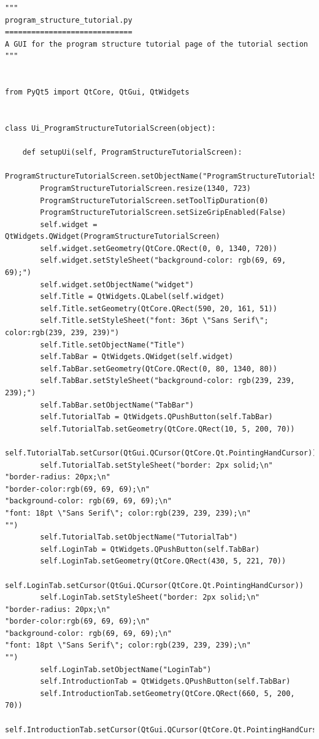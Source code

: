 \documentclass{article}
\begin{document}
\begin{lstlisting}
"""
program_structure_tutorial.py
=============================
A GUI for the program structure tutorial page of the tutorial section
"""


from PyQt5 import QtCore, QtGui, QtWidgets


class Ui_ProgramStructureTutorialScreen(object):

    def setupUi(self, ProgramStructureTutorialScreen):
        ProgramStructureTutorialScreen.setObjectName("ProgramStructureTutorialScreen")
        ProgramStructureTutorialScreen.resize(1340, 723)
        ProgramStructureTutorialScreen.setToolTipDuration(0)
        ProgramStructureTutorialScreen.setSizeGripEnabled(False)
        self.widget = QtWidgets.QWidget(ProgramStructureTutorialScreen)
        self.widget.setGeometry(QtCore.QRect(0, 0, 1340, 720))
        self.widget.setStyleSheet("background-color: rgb(69, 69, 69);")
        self.widget.setObjectName("widget")
        self.Title = QtWidgets.QLabel(self.widget)
        self.Title.setGeometry(QtCore.QRect(590, 20, 161, 51))
        self.Title.setStyleSheet("font: 36pt \"Sans Serif\"; color:rgb(239, 239, 239)")
        self.Title.setObjectName("Title")
        self.TabBar = QtWidgets.QWidget(self.widget)
        self.TabBar.setGeometry(QtCore.QRect(0, 80, 1340, 80))
        self.TabBar.setStyleSheet("background-color: rgb(239, 239, 239);")
        self.TabBar.setObjectName("TabBar")
        self.TutorialTab = QtWidgets.QPushButton(self.TabBar)
        self.TutorialTab.setGeometry(QtCore.QRect(10, 5, 200, 70))
        self.TutorialTab.setCursor(QtGui.QCursor(QtCore.Qt.PointingHandCursor))
        self.TutorialTab.setStyleSheet("border: 2px solid;\n"
"border-radius: 20px;\n"
"border-color:rgb(69, 69, 69);\n"
"background-color: rgb(69, 69, 69);\n"
"font: 18pt \"Sans Serif\"; color:rgb(239, 239, 239);\n"
"")
        self.TutorialTab.setObjectName("TutorialTab")
        self.LoginTab = QtWidgets.QPushButton(self.TabBar)
        self.LoginTab.setGeometry(QtCore.QRect(430, 5, 221, 70))
        self.LoginTab.setCursor(QtGui.QCursor(QtCore.Qt.PointingHandCursor))
        self.LoginTab.setStyleSheet("border: 2px solid;\n"
"border-radius: 20px;\n"
"border-color:rgb(69, 69, 69);\n"
"background-color: rgb(69, 69, 69);\n"
"font: 18pt \"Sans Serif\"; color:rgb(239, 239, 239);\n"
"")
        self.LoginTab.setObjectName("LoginTab")
        self.IntroductionTab = QtWidgets.QPushButton(self.TabBar)
        self.IntroductionTab.setGeometry(QtCore.QRect(660, 5, 200, 70))
        self.IntroductionTab.setCursor(QtGui.QCursor(QtCore.Qt.PointingHandCursor))

\end{lstlisting}
\end{document}
